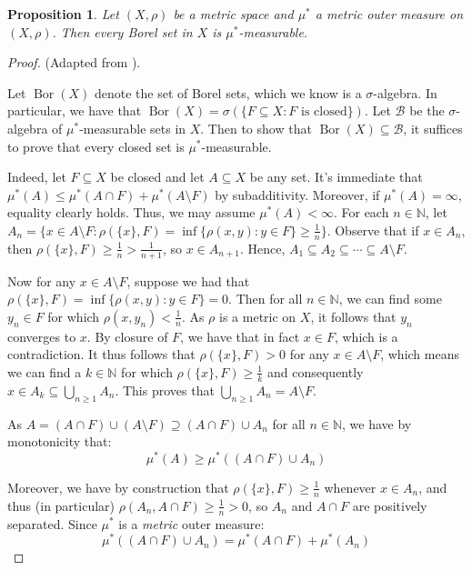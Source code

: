 \documentclass{article}[11pt]
\newcommand*{\N}{\mathbb{N}}
\DeclareMathOperator*{\Bor}{Bor}
\theoremstyle{dotless}
\newtheorem{prop}[thm]{Proposition}
\begin{document}
\begin{prop}
	Let $(X, \rho)$ be a metric space and $\mu^*$ a metric outer measure on $(X, \rho)$. Then 
	every Borel set in $X$ is $\mu^*$-measurable.
\end{prop}
\begin{proof}
	(Adapted from \cite{Fol}).
	\bigskip
	
	\noindent
	Let $\Bor(X)$ denote the set of Borel sets, which we know is a $\sigma$-algebra. In particular, we have that
	$\Bor(X) = \sigma(\{ F \subseteq X : F \text{ is closed} \})$. Let $\mathcal{B}$ be the $\sigma$-algebra of $\mu^*$-measurable
	sets in $X$. Then to show that $\Bor(X) \subseteq \mathcal{B}$, it suffices to prove that every closed set is $\mu^*$-measurable.
	\bigskip
	
	\noindent
	Indeed, let $F \subseteq X$ be closed and let $A \subseteq X$ be any set. It's immediate that
	$\mu^*(A) \leqslant \mu^*(A \cap F) + \mu^*(A \setminus F)$ by subadditivity. Moreover, if
	$\mu^*(A) = \infty$, equality clearly holds. Thus, we may assume $\mu^*(A) < \infty$.
	For each $n \in \N$, let $A_n = \{ x \in A \setminus F : \rho(\{x\}, F) = \inf\{ \rho(x,y) : y \in F \} \geqslant \frac{1}{n} \}$.
	Observe that if $x \in A_n$, then $\rho(\{x\}, F) \geqslant \frac{1}{n} > \frac{1}{n+1}$, so $x \in A_{n+1}$.
	Hence, $A_1 \subseteq A_2 \subseteq \cdots \subseteq A \setminus F$.
	\bigskip
	
	\noindent
	Now for any $x \in A \setminus F$, suppose we had that $\rho(\{x\}, F) = \inf\{ \rho(x,y) : y \in F \} = 0$. 
	Then for all $n \in \N$, we can find some $y_n \in F$ for which $\rho(x,y_n) < \frac{1}{n}$. As $\rho$ is a metric
	on $X$, it follows that $y_n$ converges to $x$. By closure of $F$, we have that in fact $x \in F$, which is a contradiction.
	It thus follows that $\rho(\{x\}, F) > 0$ for any $x \in A \setminus F$, which means we can find a $k \in \N$ for which
	$\rho(\{x\}, F) \geqslant \frac{1}{k}$ and consequently $x \in A_k \subseteq \bigcup_{n \geqslant 1} A_n$. This proves
	that $\bigcup_{n \geqslant 1} A_n = A \setminus F$.
	\bigskip
	
	\noindent
	As $A = (A \cap F) \cup (A \setminus F) \supseteq (A \cap F) \cup A_n$ for all $n \in \N$, we have by monotonicity that:
	\[ \mu^*(A) \geqslant \mu^*((A \cap F) \cup A_n) \]
	
	\noindent
	Moreover, we have by construction that $\rho(\{x\}, F) \geqslant \frac{1}{n}$ whenever $x \in A_n$, and thus
	(in particular) $\rho(A_n, A \cap F) \geqslant \frac{1}{n} > 0$, so $A_n$ and $A \cap F$ are positively separated. 
	Since $\mu^*$ is a \textit{metric} outer measure:
	\[ \mu^*((A \cap F) \cup A_n) = \mu^*(A \cap F) + \mu^*(A_n) \]
	

\end{proof}
\end{document}
